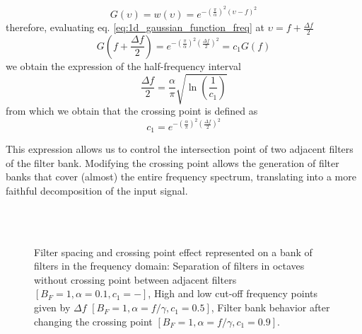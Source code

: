 \begin{equation}\label{eq:1d_gaussian_function_freq}
    G(\upsilon) = w(\upsilon) = e ^{-\left(\frac{\pi}{\alpha}\right) ^{2} (\upsilon-f)^2}
\end{equation}
therefore, evaluating eq. \eqref{eq:1d_gaussian_function_freq} at $\upsilon = f + \frac{\Delta f}{2}$
\begin{equation}\label{eq:constant_crossing_point}
    G\left(f + \frac{\Delta f}{2}\right) = e^{-\left(\frac{\pi}{\alpha}\right)^2 \left(\frac{\Delta f}{2}\right)^2} = c_1 G(f) 
\end{equation}
we obtain the expression of the half-frequency interval 
\begin{equation}\label{eq:frequency_interval_crossing_point}
    \frac{\Delta f}{2} = \frac{\alpha}{\pi}\sqrt{\ln \left(\frac{1}{c_1}\right)}
\end{equation}
from which we obtain that the crossing point is defined as
\begin{equation}\label{eq:crossing_point}
    c_1 = e^{-\left(\frac{\alpha}{\pi} \right)^2 \left(\frac{\Delta f}{2}\right)^2 }
\end{equation}

This expression allows us to control the intersection point of two adjacent filters of the filter bank. Modifying the crossing point allows the generation of filter banks that cover (almost) the entire frequency spectrum, translating into a more faithful decomposition of the input signal.

\begin{figure}[!ht]
\centering
     \\
    \\
\caption{Filter spacing and crossing point effect represented on a bank of filters in the frequency domain:  Separation of filters in octaves without crossing point between adjacent filters $[B_F=1, \alpha=0.1, c_1=-]$,  High and low cut-off frequency points given by $\Delta f$ $[B_F=1, \alpha=f/\gamma, c_1=0.5]$,  Filter bank behavior after changing the crossing point $[B_F=1, \alpha=f/\gamma, c_1=0.9]$.}\label{fig:1d_filterbank_spacing}
\end{figure}


